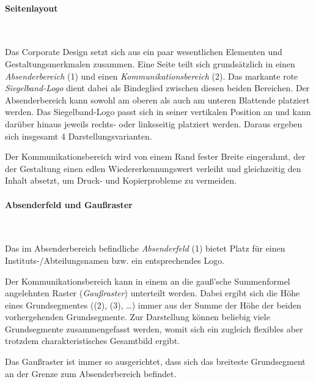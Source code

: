 \paragraph{Seitenlayout}\hfill\\
\begin{minipage}[t]{0.45\textwidth}
\vspace*{0pt}
\centering{}%
\end{minipage}
\begin{minipage}[t]{0.55\textwidth}
\vspace*{0pt}
Das Corporate Design setzt sich aus ein paar wesentlichen Elementen und
Gestaltungsmerkmalen zusammen.
Eine Seite teilt sich grundsätzlich in einen \emph{Absenderbereich} (1)
und einen \emph{Kommunikationsbereich} (2).
%
Das markante rote \emph{Siegelband-Logo} dient dabei als Bindeglied zwischen
diesen beiden Bereichen. 
%
Der Absenderbereich kann sowohl am oberen als auch am unteren Blattende
platziert werden.
Das Siegelband-Logo passt sich in seiner vertikalen Position an
und kann darüber hinaus jeweils rechts- oder linksseitig platziert werden.
Daraus ergeben sich insgesamt 4 Darstellungsvarianten.

Der Kommunikationsbereich wird von einem Rand fester Breite eingerahmt,
der der Gestaltung einen edlen Wiedererkennungswert verleiht und gleichzeitig
den Inhalt absetzt, um Druck- und Kopierprobleme zu vermeiden.
\end{minipage}\bigskip

\paragraph{Absenderfeld und Gaußraster}\hfill\\
\begin{minipage}[t]{0.45\textwidth}
\vspace*{0pt}
\centering{}%
\end{minipage}
\begin{minipage}[t]{0.55\textwidth}
\vspace*{0pt}
Das im Absenderbereich befindliche \emph{Absenderfeld} (1) bietet Platz für
einen \mbox{Instituts-/}Abteilungsnamen bzw. ein entsprechendes Logo.
%

Der Kommunikationsbereich kann in einem an die gauß'sche Summenformel
angelehnten Raster (\emph{Gaußraster}) unterteilt werden.
%
Dabei ergibt sich die Höhe eines Grundsegmentes ((2), (3), \ldots)
immer aus der Summe der Höhe der beiden vorhergehenden Grundsegmente.
Zur Darstellung können beliebig viele Grundsegmente zusammengefasst werden,
womit sich ein zugleich flexibles aber trotzdem charakteristisches
Gesamtbild ergibt.

Das Gaußraster ist immer so ausgerichtet, dass sich das breiteste Grundsegment
an der Grenze zum Absenderbereich befindet.
\end{minipage}


